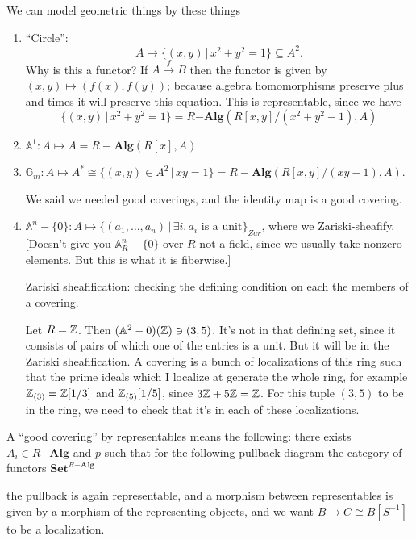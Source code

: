 \documentclass[class=report, crop=false,a4paper,twoside]{standalone}
\begin{document}
\begin{example}
	We can model geometric things by these things

	\begin{enumerate}
		\item ``Circle'':
	\[
	A \mapsto \{(x,y) \,|\, x^2 + y^2 = 1\} \subseteq A^2.
	\]
	Why is this a functor? If $A \xrightarrow{f} B$ then the functor is given by $(x,y) \mapsto (f(x),f(y))$; because algebra homomorphisms preserve plus and times it will preserve this equation. This is representable, since we have
	\[
	\{(x,y) \,|\, x^2 + y^2 = 1\} = R\mathbf{-Alg}(R[x,y]/(x^2 + y^2 - 1),A)
	\]

		\item $\mathbb{A}^1: A \mapsto A = R-\mathbf{Alg}(R[x],A)$
		\item $\mathbb{G}_m: A \mapsto A^* \cong \{(x,y) \in A^2 \,|\, xy = 1\} = R-\mathbf{Alg}(R[x,y]/(xy - 1),A)$.

		We said we needed good coverings, and the identity map is a good covering. 

	\item $\mathbb{A}^n - \{0\}: A \mapsto \{(a_1,\dots,a_n) \,|\, \exists i, a_i \text{ is a unit}\}_{Zar}$, where we Zariski-sheafify. [Doesn't give you $\mathbb{A}^n_R - \{0\}$ over $R$ not a field, since we usually take nonzero elements. But this is what it is fiberwise.]

	Zariski sheafification: checking the defining condition on each the members of a covering.

	\begin{example}
		Let $R = \mathbb{Z}$. Then $(\mathbb{A}^2 - 0)(\mathbb{Z}) \ni (3,5)$. It's not in that defining set, since it consists of pairs of which one of the entries is a unit. But it will be in the Zariski sheafification. A covering is a bunch of localizations of this ring such that the prime ideals which I localize at generate the whole ring, for example $\mathbb{Z}_{(3)} = \mathbb{Z}[1/3]$ and $\mathbb{Z}_{(5)}[1/5]$, since $3\mathbb{Z} + 5\mathbb{Z} = \mathbb{Z}$. For this tuple $(3,5)$ to be in the ring, we need to check that it's in each of these localizations.
	\end{example}
	\end{enumerate}
\end{example}

A ``good covering'' by representables means the following: there exists $A_i \in R\mathbf{-Alg}$ and $p$ such that for the following pullback diagram the category of functors $\mathbf{Set}^{R\mathbf{-Alg}}$
\begin{center}
\end{center}
the pullback is again representable, and a morphism between representables is given by a morphism of the representing objects, and we want $B \to C \cong B[S^{-1}]$ to be a localization.
\end{document}
